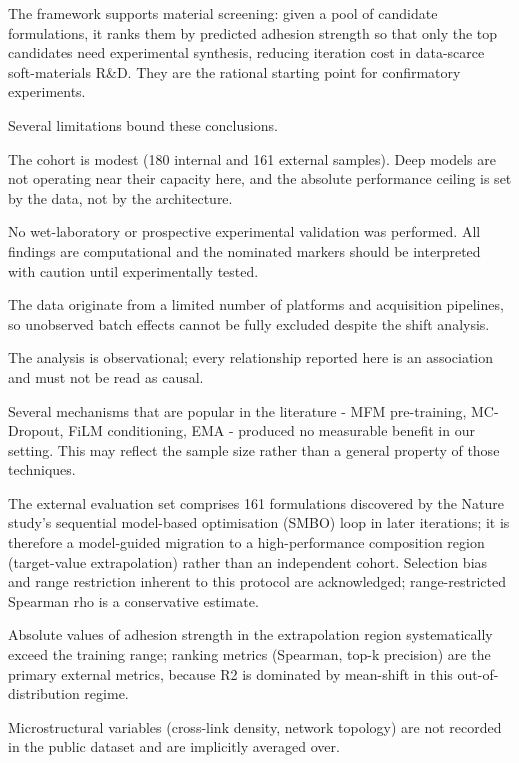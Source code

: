 \documentclass[utf8]{FrontiersinHarvard}
\begin{document}
The framework supports material screening: given a pool of candidate formulations, it ranks them by predicted adhesion strength so that only the top candidates need experimental synthesis, reducing iteration cost in data-scarce soft-materials R&D. \cite{kim2021polymerGA,lundberg2017shap} They are the rational starting point for confirmatory experiments.

Several limitations bound these conclusions.

\item The cohort is modest (180 internal and 161 external samples). Deep models are not operating near their capacity here, and the absolute performance ceiling is set by the data, not by the architecture.
\item No wet-laboratory or prospective experimental validation was performed. All findings are computational and the nominated markers should be interpreted with caution until experimentally tested.
\item The data originate from a limited number of platforms and acquisition pipelines, so unobserved batch effects cannot be fully excluded despite the shift analysis.
\item The analysis is observational; every relationship reported here is an association and must not be read as causal.
\item Several mechanisms that are popular in the literature - MFM pre-training, MC-Dropout, FiLM conditioning, EMA - produced no measurable benefit in our setting. This may reflect the sample size rather than a general property of those techniques.
\item The external evaluation set comprises 161 formulations discovered by the Nature study's sequential model-based optimisation (SMBO) loop in later iterations; it is therefore a model-guided migration to a high-performance composition region (target-value extrapolation) rather than an independent cohort. Selection bias and range restriction inherent to this protocol are acknowledged; range-restricted Spearman rho is a conservative estimate.
\item Absolute values of adhesion strength in the extrapolation region systematically exceed the training range; ranking metrics (Spearman, top-k precision) are the primary external metrics, because R2 is dominated by mean-shift in this out-of-distribution regime.
\item Microstructural variables (cross-link density, network topology) are not recorded in the public dataset and are implicitly averaged over.
\end{document}
